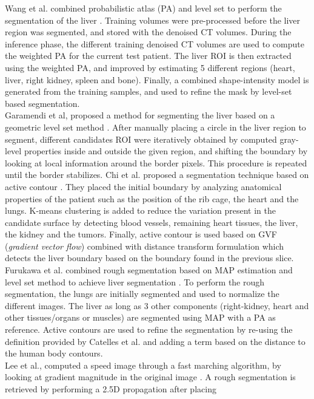 \documentclass[]{article}
\begin{document}
	
	Wang et al. combined probabilistic atlas (PA) and level set to perform the segmentation of the liver \cite{Wang2016}. Training volumes were pre-processed before the liver region was
	segmented, and stored with the denoised CT volumes. During the inference
	phase, the different training denoised CT volumes are used to compute
	the weighted PA for the current test patient. The liver ROI is then
	extracted using the weighted PA, and improved by estimating 5 different
	regions (heart, liver, right kidney, spleen and bone). Finally, a
	combined shape-intensity model is generated from the training samples,
	and used to refine the mask by level-set based segmentation.\\
	Garamendi et al, proposed a method for segmenting the liver based on a
	geometric level set method \cite{Garamendi2007}. After manually placing a circle in the liver
	region to segment, different candidates ROI were iteratively obtained by
	computed gray-level properties inside and outside the given region, and
	shifting the boundary by looking at local information around the border
	pixels. This procedure is repeated until the border stabilizes.
	Chi et al. proposed a segmentation technique based on active
	contour \cite{Chi2007}. They placed the initial boundary by analyzing anatomical
	properties of the patient such as the position of the rib cage, the
	heart and the lungs. K-means clustering is added to reduce the variation
	present in the candidate surface by detecting blood vessels, remaining
	heart tissues, the liver, the kidney and the tumors. Finally, active
	contour is used based on GVF (\emph{gradient vector flow}) combined with
	distance transform formulation which detects the liver boundary based on
	the boundary found in the previous slice.
	Furukawa et al. combined rough segmentation based on MAP estimation and
	level set method to achieve liver segmentation \cite{Furukawa2007}. To perform the rough
	segmentation, the lungs are initially segmented and used to normalize
	the different images. The liver as long as 3 other components
	(right-kidney, heart and other tissues/organs or muscles) are segmented
	using MAP with a PA as reference. Active contours are used to refine the
	segmentation by re-using the definition provided by Catelles et al. and
	adding a term based on the distance to the human body contours.\\ 
	Lee et al., computed a speed image through a fast marching algorithm, by
	looking at gradient magnitude in the original image \cite{Lee2007}. A rough
	segmentation is retrieved by performing a 2.5D propagation after placing
\end{document}
